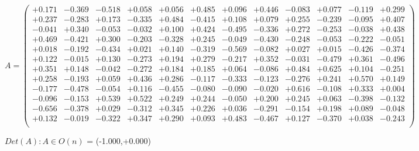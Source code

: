 \documentclass[9pt]{article}
\theoremstyle{plain}
\theoremstyle{definition}
\theoremstyle{remark}
\numberwithin{equation}{section}
\begin{document}
$A = \left(
\begin{array}{
cccccccccccc}
+0.171 & -0.369 & -0.518 & +0.058 & +0.056 & +0.485 & +0.096 & +0.446 & -0.083 & +0.077 & -0.119 & +0.299 \\
+0.237 & -0.283 & +0.173 & -0.335 & +0.484 & -0.415 & +0.108 & +0.079 & +0.255 & -0.239 & -0.095 & +0.407 \\
-0.041 & +0.340 & -0.053 & -0.032 & +0.100 & +0.424 & -0.495 & -0.336 & +0.272 & -0.253 & -0.038 & +0.438 \\
+0.469 & -0.421 & +0.300 & -0.203 & -0.328 & +0.245 & -0.049 & -0.430 & -0.248 & -0.053 & -0.222 & -0.051 \\
+0.018 & -0.192 & -0.434 & +0.021 & +0.140 & -0.319 & -0.569 & -0.082 & +0.027 & +0.015 & -0.426 & -0.374 \\
+0.122 & -0.015 & +0.130 & -0.273 & +0.194 & +0.279 & -0.217 & +0.352 & -0.031 & -0.479 & +0.361 & -0.496 \\
+0.351 & +0.148 & -0.042 & -0.272 & +0.184 & +0.185 & +0.064 & -0.086 & +0.484 & +0.625 & +0.104 & -0.251 \\
+0.258 & -0.193 & +0.059 & +0.436 & +0.286 & -0.117 & -0.333 & -0.123 & -0.276 & +0.241 & +0.570 & +0.149 \\
-0.177 & -0.478 & -0.054 & +0.116 & -0.455 & -0.080 & -0.090 & -0.020 & +0.616 & -0.108 & +0.333 & +0.004 \\
-0.096 & -0.153 & +0.539 & +0.522 & +0.249 & +0.244 & -0.050 & +0.200 & +0.245 & +0.063 & -0.398 & -0.132 \\
-0.656 & -0.378 & +0.029 & -0.312 & +0.345 & +0.226 & +0.036 & -0.291 & -0.154 & +0.198 & +0.089 & -0.048 \\
+0.132 & -0.019 & -0.322 & +0.347 & +0.290 & +0.093 & +0.483 & -0.467 & +0.127 & -0.370 & +0.038 & -0.243 \\
\end{array}
\right)$ \newline 

$Det(A) :   A \in O(n)$ = (-1.000,+0.000)
\end{document}
